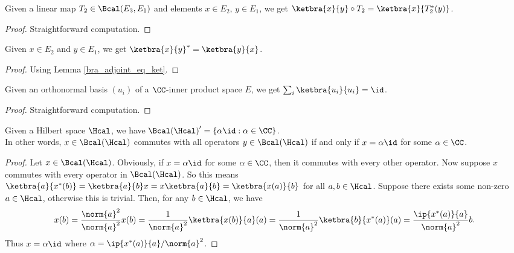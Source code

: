  \begin{corollary}\label{rankOne_comp_linearMap}\leanok
  Given a linear map $T_2\in\Bcal(E_3,E_1)$ and elements $x\in E_2$, $y\in E_1$, we get $\ketbra{x}{y}\circ T_2=\ketbra{x}{T_2^*(y)}$.
 \end{corollary}
 \begin{proof}\leanok
  Straightforward computation.
 \end{proof}
 
 \begin{corollary}\label{rankOne_adjoint}\leanok
  Given $x\in E_2$ and $y\in E_1$, we get $\ketbra{x}{y}^*=\ketbra{y}{x}$.
 \end{corollary}
 \begin{proof}\leanok
  Using Lemma \ref{bra_adjoint_eq_ket}.
 \end{proof}

 \begin{lemma}\label{sum_rankOne_onb_eq_id}\leanok
  Given an orthonormal basis $(u_i)$ of a $\CC$-inner product space $E$, we get $\sum_i\ketbra{u_i}{u_i}=\id$.
 \end{lemma}
 \begin{proof}\leanok
  Straightforward computation.
 \end{proof}

 \begin{lemma}\label{ContinuousLinearMap.centralizer}\leanok
  Given a Hilbert space $\Hcal$, we have ${\Bcal(\Hcal)}^\prime=\{\alpha\id:\alpha\in\CC\}$.\\
  In other words, $x\in\Bcal(\Hcal)$ commutes with all operators $y\in\Bcal(\Hcal)$ if and only if $x=\alpha\id$ for some $\alpha\in\CC$.
 \end{lemma}
 \begin{proof}\leanok
  Let $x\in\Bcal(\Hcal)$. Obviously, if $x=\alpha\id$ for some $\alpha\in\CC$, then it commutes with every other operator. Now suppose $x$ commutes with every operator in $\Bcal(\Hcal)$.
  So this means $\ketbra{a}{x^*(b)}=\ketbra{a}{b}x=x\ketbra{a}{b}=\ketbra{x(a)}{b}$ for all $a,b\in\Hcal$.
  Suppose there exists some non-zero $a\in\Hcal$, otherwise this is trivial. Then, for any $b\in\Hcal$, we have
  \[x(b)=\frac{\norm{a}^2}{\norm{a}^2}x(b)=\frac{1}{\norm{a}^2}\ketbra{x(b)}{a}(a)=\frac{1}{\norm{a}^2}\ketbra{b}{x^*(a)}(a)=\frac{\ip{x^*(a)}{a}}{\norm{a}^2}b.\]
  Thus $x=\alpha\id$ where $\alpha=\ip{x^*(a)}{a}/\norm{a}^2$.
 \end{proof}

